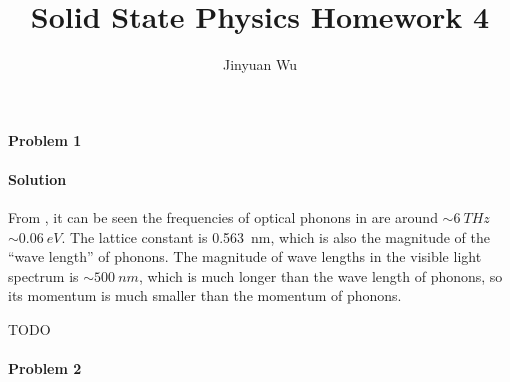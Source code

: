 \documentclass[hyperref, a4paper]{article}
\title{Solid State Physics Homework 4}
\author{Jinyuan Wu}
\begin{document}
\maketitle

\paragraph{Problem 1}

\paragraph{Solution} From \cite{messaoudi2015band},
it can be seen the frequencies of optical phonons in  are around $\sim \SI{6}{THz}$
$\sim \SI{0.06}{eV}$.
The lattice constant is \SI{0.563}{nm},
which is also the magnitude of the ``wave length'' of phonons.
The magnitude of wave lengths in the visible light spectrum is $\sim \SI{500}{nm}$,
which is much longer than the wave length of phonons, 
so its momentum is much smaller than the momentum of phonons.

TODO

\paragraph{Problem 2}
\end{document}

